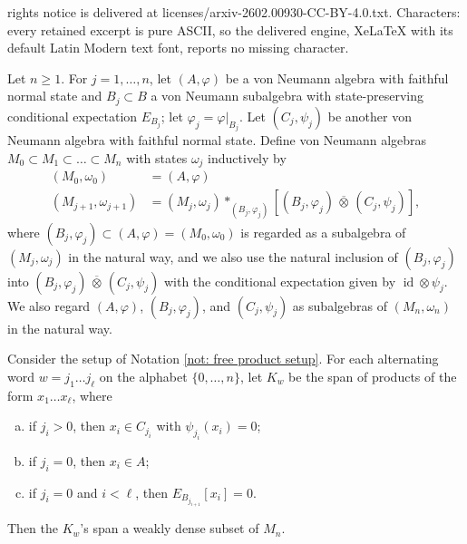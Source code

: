 \documentclass[10pt,a4paper]{amsart}
\newcommand{\id}{\operatorname{id}}
\newcommand{\ootimes}{\, \overline{\otimes} \,}
\begin{document}
rights notice is delivered at licenses/arxiv-2602.00930-CC-BY-4.0.txt. Characters: every retained excerpt is pure ASCII, so the delivered engine, XeLaTeX with its default Latin Modern text font, reports no missing character.
\begin{notation} \label{not: free product setup}
	Let $n \geq 1$.  For $j=1, \dots, n$, let $(A,\varphi)$ be a von Neumann algebra with faithful normal state and $B_j \subset B$ a von Neumann subalgebra with state-preserving conditional expectation $E_{B_j}$; let $\varphi_j = \varphi|_{B_j}$.  Let $(C_j,\psi_j)$ be another von Neumann algebra with faithful normal state.  Define von Neumann algebras $M_0 \subset M_1 \subset \dots \subset M_n$ with states $\omega_j$ inductively by
	\begin{align*}
		(M_0,\omega_0) &= (A,\varphi) \\
		(M_{j+1},\omega_{j+1}) &= (M_j,\omega_j) *_{(B_j,\varphi_j)} [(B_j,\varphi_j) \ootimes (C_j,\psi_j)],
	\end{align*}
	where $(B_j,\varphi_j) \subset (A,\varphi) = (M_0,\omega_0)$ is regarded as a subalgebra of $(M_j,\omega_j)$ in the natural way, and we also use the natural inclusion of $(B_j,\varphi_j)$ into $(B_j,\varphi_j) \ootimes (C_j,\psi_j)$ with the conditional expectation given by $\id \otimes \psi_j$.  We also regard $(A,\varphi)$, $(B_j,\varphi_j)$, and $(C_j,\psi_j)$ as subalgebras of $(M_n,\omega_n)$ in the natural way.
\end{notation}

\begin{lem} \label{lem: word decomposition}
	Consider the setup of Notation \ref{not: free product setup}.  For each alternating word $w = j_1 \dots j_\ell$ on the alphabet $\{0,\dots,n\}$, let $K_w$ be the span of products of the form $x_1 \dots x_\ell$, where
	\begin{enumerate}[(a)]
		\item if $j_i > 0$, then $x_i \in C_{j_i}$ with $\psi_{j_i}(x_i) = 0$;
		\item if $j_i = 0$, then $x_i \in A$;
		\item if $j_i = 0$ and $i < \ell$, then $E_{B_{j_{i+1}}}[x_i] = 0$.
	\end{enumerate}
	Then the $K_w$'s span a weakly dense subset of $M_n$.
\end{lem}
\end{document}
